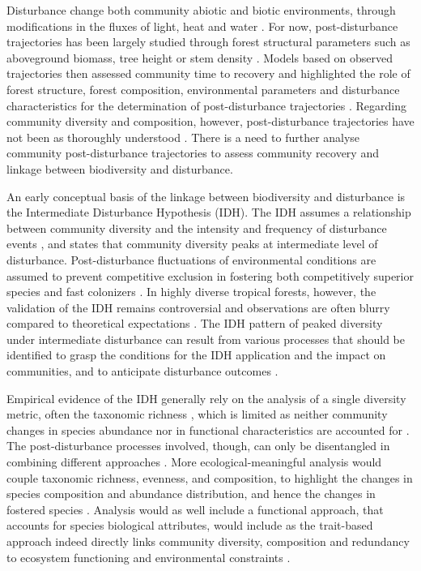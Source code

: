 \documentclass[fleqn,10pt]{ArtEcoFoG} %
\begin{document}
Disturbance change both community abiotic and biotic environments,
through modifications in the fluxes of light, heat and water
\citep{Goulamoussene2017}. For now, post-disturbance trajectories has
been largely studied through forest structural parameters such as
aboveground biomass, tree height or stem density
\citep{Piponiot2016, Rutishauser2016}. Models based on observed
trajectories then assessed community time to recovery and highlighted
the role of forest structure, forest composition, environmental
parameters and disturbance characteristics for the determination of
post-disturbance trajectories \citep{Herault2018}. Regarding community
diversity and composition, however, post-disturbance trajectories have
not been as thoroughly understood \citep{Guitet2018, Molino2001}. There
is a need to further analyse community post-disturbance trajectories to
assess community recovery and linkage between biodiversity and
disturbance.

An early conceptual basis of the linkage between biodiversity and
disturbance is the Intermediate Disturbance Hypothesis (IDH). The IDH
assumes a relationship between community diversity and the intensity and
frequency of disturbance events \citep{Connell1978}, and states that
community diversity peaks at intermediate level of disturbance.
Post-disturbance fluctuations of environmental conditions are assumed to
prevent competitive exclusion in fostering both competitively superior
species and fast colonizers \citep{Shea2004, Pulsford2016}. In highly
diverse tropical forests, however, the validation of the IDH remains
controversial \citep{Hubbell2001, Fox2013, Sheil2013} and observations
are often blurry compared to theoretical expectations
\citep{Hugues2007, Sheil2003, Norden2017}. The IDH pattern of peaked
diversity under intermediate disturbance can result from various
processes that should be identified to grasp the conditions for the IDH
application and the impact on communities, and to anticipate disturbance
outcomes \citep{Sheil2003, Shea2004}.

Empirical evidence of the IDH generally rely on the analysis of a single
diversity metric, often the taxonomic richness \citep{Molino2001}, which
is limited as neither community changes in species abundance nor in
functional characteristics are accounted for
\citep{Mayfield2010, Villeger2011}. The post-disturbance processes
involved, though, can only be disentangled in combining different
approaches \citep{Sheil2003, Shea2004}. More ecological-meaningful
analysis would couple taxonomic richness, evenness, and composition, to
highlight the changes in species composition and abundance distribution,
and hence the changes in fostered species \citep{Chaudhary2016}.
Analysis would as well include a functional approach, that accounts for
species biological attributes, would include as the trait-based approach
indeed directly links community diversity, composition and redundancy to
ecosystem functioning and environmental constraints
\citep{Violle2007b, Baraloto2012a}.
\end{document}
